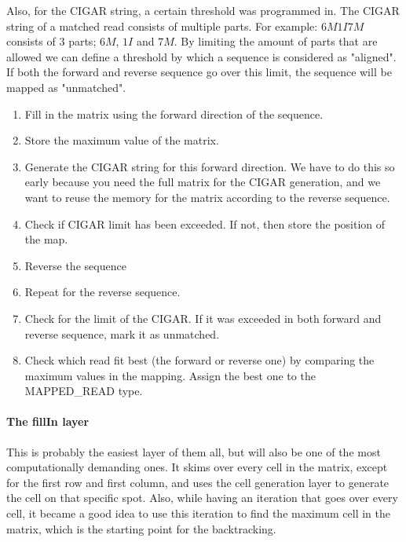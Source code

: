 Also, for the CIGAR string, a certain threshold was programmed in. The CIGAR string of a matched read consists of multiple parts. For example: $6M1I7M$ consists of 3 parts; $6M$, $1I$ and $7M$. By limiting the amount of parts that are allowed we can define a threshold by which a sequence is considered as "aligned". If both the forward and reverse sequence go over this limit, the sequence will be mapped as "unmatched".

\begin{enumerate}
	\item Fill in the matrix using the forward direction of the sequence.
	\item Store the maximum value of the matrix.
	\item Generate the CIGAR string for this forward direction. We have to do this so early because you need the full matrix for the CIGAR generation, and we want to reuse the memory for the matrix according to the reverse sequence.
	\item Check if CIGAR limit has been exceeded. If not, then store the position of the map. 
	\item Reverse the sequence
	\item Repeat for the reverse sequence.
	\item Check for the limit of the CIGAR. If it was exceeded in both forward and reverse sequence, mark it as unmatched.
	\item Check which read fit best (the forward or reverse one) by comparing the maximum values in the mapping. Assign the best one to the MAPPED\_READ type.
\end{enumerate}

\paragraph{The fillIn layer}
This is probably the easiest layer of them all, but will also be one of the most computationally demanding ones. It skims over every cell in the matrix, except for the first row and first column, and uses the cell generation layer to generate the cell on that specific spot. Also, while having an iteration that goes over every cell, it became a good idea to use this iteration to find the maximum cell in the matrix, which is the starting point for the backtracking.

